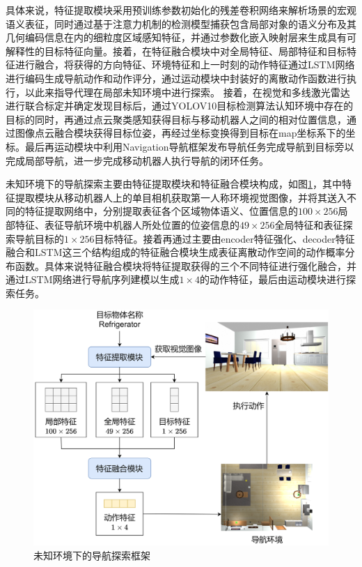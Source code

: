 具体来说，特征提取模块采用预训练参数初始化的残差卷积网络来解析场景的宏观语义表征，同时通过基于注意力机制的检测模型捕获包含局部对象的语义分布及其几何编码信息在内的细粒度区域感知特征，并通过参数化嵌入映射层来生成具有可解释性的目标特征向量。接着，在特征融合模块中对全局特征、局部特征和目标特征进行融合，将获得的方向特征、环境特征和上一时刻的动作特征通过LSTM网络进行编码生成导航动作和动作评分，通过运动模块中封装好的离散动作函数进行执行，以此来指导代理在局部未知环境中进行探索。
接着，在视觉和多线激光雷达进行联合标定并确定发现目标后，通过YOLOV10目标检测算法认知环境中存在的目标的同时，再通过点云聚类感知获得目标与移动机器人之间的相对位置信息，通过图像点云融合模块获得目标位姿，再经过坐标变换得到目标在map坐标系下的坐标。最后再运动模块中利用Navigation导航框架发布导航任务完成导航到目标旁以完成局部导航，进一步完成移动机器人执行导航的闭环任务。

未知环境下的导航探索主要由特征提取模块和特征融合模块构成，如图\ref{提取-融合框架}，其中特征提取模块从移动机器人上的单目相机获取第一人称环境视觉图像，并将其送入不同的特征提取网络中，分别提取表征各个区域物体语义、位置信息的$100 \times 256$局部特征、表征导航环境中机器人所处位置的位姿信息的$49 \times 256$全局特征和表征探索导航目标的$1 \times 256$目标特征。接着再通过主要由encoder特征强化、decoder特征融合和LSTM这三个结构组成的特征融合模块生成表征离散动作空间的动作概率分布函数。具体来说特征融合模块将特征提取获得的三个不同特征进行强化融合，并通过LSTM网络进行导航序列建模以生成$1 \times 4$的动作特征，最后由运动模块进行探索任务。
\begin{figure}[htbp]
    \centering
    \includegraphics[scale=0.07]{Fig/提取-融合框架.png}
    \caption{\label{提取-融合框架}未知环境下的导航探索框架}
\end{figure}

